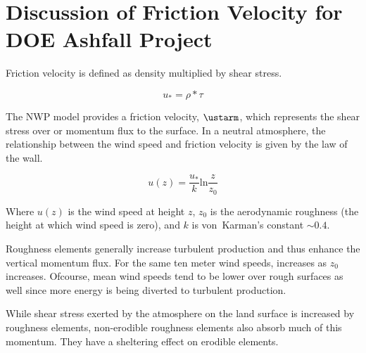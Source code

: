\section{Discussion of Friction Velocity for DOE Ashfall Project}

Friction velocity is defined as density multiplied by shear stress.

$$u_* = \rho * \tau$$

The NWP model provides a friction velocity, $\ustarm$, which represents the shear stress over or momentum flux to
the surface. In a neutral atmosphere, the relationship between the wind speed and friction velocity is given by the
law of the wall.

$$u(z) = \frac{u_*}{k} \mathrm{ln} \frac{z}{z_0}$$

Where $u(z)$ is the wind speed at height $z$, $z_0$ is the aerodynamic roughness (the height at which wind speed is zero),
and $k$ is von~Karman's constant $\sim 0.4$. 

Roughness elements generally increase turbulent production and thus enhance the vertical momentum flux. For the same
ten meter wind speeds, \ustar increases as $z_0$ increases. Ofcourse, mean wind speeds tend to be lower over
rough surfaces as well since more energy is being diverted to turbulent production. 

%
While shear stress exerted by the atmosphere on the land surface is increased by roughness elements, non-erodible roughness elements
also absorb much of this momentum. They have a sheltering effect on erodible elements.

